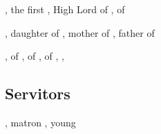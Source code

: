 \section[Resphain]{}
\begin{dramatispersonae}
  \dramdead[Thanatzil]{\Thanatzil}{\resphan}{\male},
    the first \resphan
  \dramitem[Azraid]  {\Azraid}{\resphan}{\male}, 
    High Lord of 
  \dramitem[Teshrial]{\Teshrial}{\resphan}{\male}, 
     of \CiriathSepher
    \begin{subdramatispersonae}
      \dramitem[Zereth]{\Zereth}{\resphan}{\female}, 
        daughter of {\Azraid}, mother of {\Teshrial}
      \dramitem[Tuerdal]{\Tuerdal}{\resphan}{\male}, 
        father of {\Teshrial}
    \end{subdramatispersonae}
  \dramitem[Firaxel] {\Firaxel}  {\resphan}{\female},
    \ketheran of 
  \dramitem[Urizeth] {\Urizeth}  {\resphan}{\female}, 
     of \CiriathSepher
  \dramitem[Ganethed]{\Ganethed} {\resphan}{\male},   
     of \CiriathSepher
  \dramitem[Achsah]  {\Achsah}   {\resphan}{\female}, 
     {\resphan}{\female}, 
\end{dramatispersonae}

\subsection{Servitors}
\begin{dramatispersonae}
  , \naor matron
  , young \naorim
\end{dramatispersonae}



\section[Pelidorians]{}
